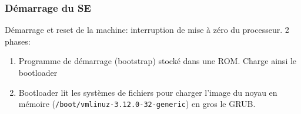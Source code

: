 \subsubsection{Démarrage du SE}\label{duxe9marrage-du-se}

Démarrage et reset de la machine: interruption de mise à zéro du
processeur. 2 phases:

\begin{enumerate}
\def\labelenumi{\arabic{enumi}.}
\tightlist
\item
  Programme de démarrage (bootstrap) stocké dans une ROM. Charge ainsi
  le bootloader
\item
  Bootloader lit les systèmes de fichiers pour charger l'image du noyau
  en mémoire (\texttt{/boot/vmlinuz-3.12.0-32-generic}) en gros le GRUB.
\end{enumerate}
